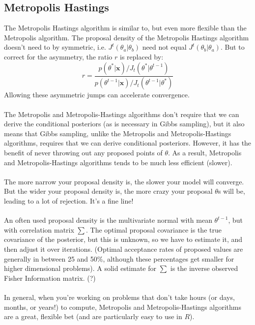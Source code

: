 \documentclass[12pt]{book}
\begin{document}
	
	\subsection{Metropolis Hastings}
The Metropolis Hastings algorithm is similar to, but even more flexible than the Metropolis algorithm. The proposal density of the Metropolis Hastings algorithm doesn't need to by symmetric, i.e. $J^t(\theta_a|\theta_b)$ need not equal $J^t(\theta_b|\theta_a)$. But to correct for the asymmetry, the ratio $r$ is replaced by:
	\begin{equation}
			r = \frac{p(\theta^*|\textbf{x}) / J_t(\theta^*|\theta^{t-1})}
			{p(\theta^{t-1}|\textbf{x}) / J_t(\theta^{t-1}|\theta^{*})}
	\end{equation}
Allowing these asymmetric jumps can accelerate convergence.
\\\\
The Metropolis and Metropolis-Hastings algorithms don't require that we can derive the conditional posteriors (as is necessary in Gibbs sampling), but it also means that Gibbs sampling, unlike the Metropolis and Metropolis-Hastings algorithms, requires that we can derive conditional posteriors. However, it has the benefit of never throwing out any proposed points of $\theta$. As a result, Metropolis and Metropolis-Hastings algorithms tends to be much less efficient (slower). 
\\\\
The more narrow your proposal density is, the slower your model will converge. But the wider your proposal density is, the more crazy your proposal $\theta$s will be, leading to a lot of rejection. It's a fine line!
\\\\
An often used proposal density is the multivariate normal with mean $\theta^{t-1}$, but with correlation matrix $\sum$. The optimal proposal covariance is the true covariance of the posterior, but this is unknown, so we have to estimate it, and then adjust it over iterations. (Optimal acceptance rates of proposed values are generally in between 25 and 50\%, although these percentages get smaller for higher dimensional problems). A solid estimate for $\sum$ is the inverse observed Fisher Information matrix. (?)
\\\\
In general, when you're working on problems that don't take hours (or days, months, or years!) to compute, Metropolis and Metropolis-Hastings algorithms are a great, flexible bet (and are particularly easy to use in $R$).
\end{document}
